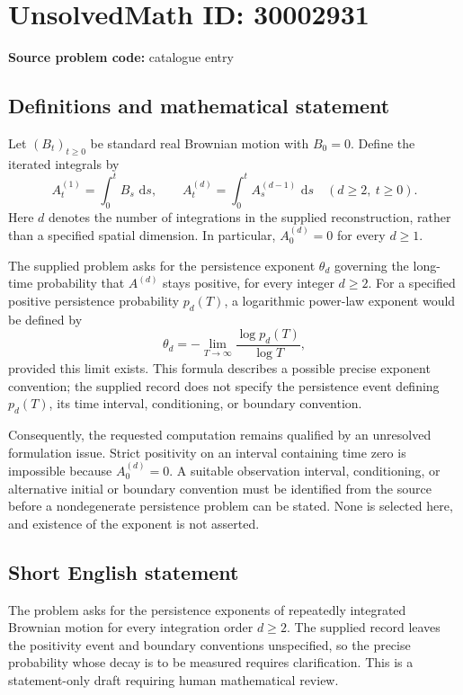 \documentclass[11pt]{article}
\newcommand{\dd}{\,\mathrm{d}}
\begin{document}
\section*{UnsolvedMath ID: 30002931}
\textbf{Source problem code:} catalogue entry
\subsection{Definitions and mathematical statement}
Let \((B_t)_{t\geq0}\) be standard real Brownian motion with \(B_0=0\). Define the iterated integrals by
\[
A_t^{(1)}=\int_0^t B_s\,\dd s,
\qquad
A_t^{(d)}=\int_0^t A_s^{(d-1)}\,\dd s
\quad(d\geq2,	\ t\geq0).
\]
Here \(d\) denotes the number of integrations in the supplied reconstruction, rather than a specified spatial dimension. In particular, \(A_0^{(d)}=0\) for every \(d\geq1\).

The supplied problem asks for the persistence exponent \(\theta_d\) governing the long-time probability that \(A^{(d)}\) stays positive, for every integer \(d\geq2\). For a specified positive persistence probability \(p_d(T)\), a logarithmic power-law exponent would be defined by
\[
\theta_d=-\lim_{T\to\infty}\frac{\log p_d(T)}{\log T},
\]
provided this limit exists. This formula describes a possible precise exponent convention; the supplied record does not specify the persistence event defining \(p_d(T)\), its time interval, conditioning, or boundary convention.

Consequently, the requested computation remains qualified by an unresolved formulation issue. Strict positivity on an interval containing time zero is impossible because \(A_0^{(d)}=0\). A suitable observation interval, conditioning, or alternative initial or boundary convention must be identified from the source before a nondegenerate persistence problem can be stated. None is selected here, and existence of the exponent is not asserted.
\subsection{Short English statement}
The problem asks for the persistence exponents of repeatedly integrated Brownian motion for every integration order \(d\geq2\). The supplied record leaves the positivity event and boundary conventions unspecified, so the precise probability whose decay is to be measured requires clarification. This is a statement-only draft requiring human mathematical review.
\end{document}
